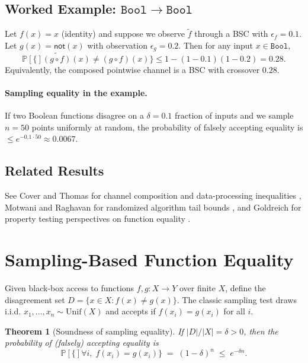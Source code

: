 \documentclass[11pt,final,hidelinks]{article}
\newtheorem{theorem}{Theorem}[section]
\newcommand{\obs}[1]{\widetilde{#1}}  %
\newcommand{\Type}[1]{\mathtt{#1}}
\newcommand{\Prob}[1]{\mathbb{P}\left[#1\right]}
\newcommand{\Bool}{\Type{Bool}}
\begin{document}
\subsection{Worked Example: $\Bool\to\Bool$}

Let $f(x)=x$ (identity) and suppose we observe $\obs{f}$ through a BSC with $\epsilon_f=0.1$. Let $g(x)=\mathsf{not}(x)$ with observation $\epsilon_g=0.2$. Then for any input $x\in\Bool$,
\begin{equation}
    \Prob\{\obs{(g\circ f)}(x)\neq (g\circ f)(x)\} \le 1-(1-0.1)(1-0.2)=0.28.
\end{equation}
Equivalently, the composed pointwise channel is a BSC with crossover $0.28$.

\paragraph{Sampling equality in the example.} If two Boolean functions disagree on a $\delta=0.1$ fraction of inputs and we sample $n=50$ points uniformly at random, the probability of falsely accepting equality is $\le e^{-0.1\cdot 50} \approx 0.0067$.

\subsection{Related Results}
See Cover and Thomas for channel composition and data-processing inequalities \cite{cover2006}, Motwani and Raghavan for randomized algorithm tail bounds \cite{motwani1995}, and Goldreich for property testing perspectives on function equality \cite{goldreich2017}.

\section{Sampling-Based Function Equality}

Given black-box access to functions $f,g:X\to Y$ over finite $X$, define the disagreement set $D=\{x\in X: f(x)\neq g(x)\}$. The classic sampling test draws i.i.d. $x_1,\dots,x_n\sim\mathrm{Unif}(X)$ and accepts if $f(x_i)=g(x_i)$ for all $i$.

\begin{theorem}[Soundness of sampling equality]
If $|D|/|X|=\delta>0$, then the probability of (falsely) accepting equality is
\begin{equation}
\Prob\{ \forall i,\; f(x_i)=g(x_i) \} \;=\; (1-\delta)^n \;\le\; e^{-\delta n}.
\end{equation}
\end{theorem}
\end{document}
